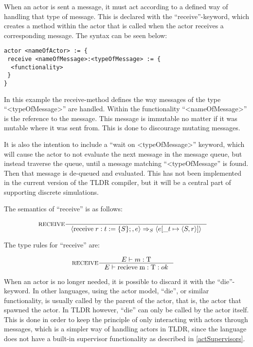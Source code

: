 When an actor is sent a message, it must act according to a defined way of handling that type of message. This is declared with the \enquote{receive}-keyword, which creates a method within the actor that is called when the actor receives a corresponding message. The syntax can be seen below:

\label{actorfuncReceive}
\begin{lstlisting}
actor <nameOfActor> := {
 receive <nameOfMessage>:<typeOfMessage> := {
  <functionality>
 }
}
\end{lstlisting}

In this example the receive-method defines the way messages of the type \enquote{<typeOfMessage>} are handled. Within the functionality \enquote{<nameOfMessage>} is the reference to the message. This message is immutable no matter if it was mutable where it was sent from. This is done to discourage mutating messages.

It is also the intention to include a \enquote{wait on <typeOfMessage>} keyword, which will cause the actor to not evaluate the next message in the message queue, but instead traverse the queue, until a message matching \enquote{<typeOfMessage} is found. Then that message is de-queued and evaluated. This has not been implemented in the current version of the TLDR compiler, but it will be a central part of supporting discrete simulations.

The semantics of \enquote{receive} is as follows:

\begin{align*}
&\inference[$\text{RECEIVE}$]{}
                           {\Braket{\Treceive r:t := \{S\};,e} \Rightarrow_S \Braket{e[\_t \mapsto \Braket{S,r}]}}
\end{align*}

The type rules for \enquote{receive} are:

\begin{align*}
&\inference[RECEIVE]{\Tenv m : \Tt}
                 {\Tenv \mathbin{\text{recieve}} \; \mathbin{\text{m}} :\Tt : ok }
\end{align*}

When an actor is no longer needed, it is possible to discard it with the \enquote{die}-keyword. In other languages, using the actor model, \enquote{die}, or similar functionality, is usually called by the parent of the actor, that is, the actor that spawned the actor. In TLDR however, \enquote{die} can only be called by the actor itself. This is done in order to keep the principle of only interacting with actors through messages, which is a simpler way of handling actors in TLDR, since the language does not have a built-in supervisor functionality as described in \cref{actSupervisors}. 

